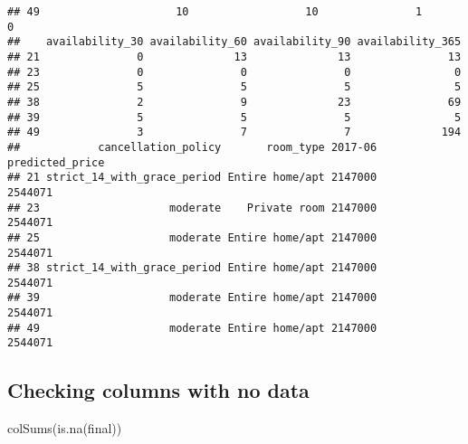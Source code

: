 \documentclass[
]{article}
\newenvironment{Shaded}{\begin{snugshade}}{\end{snugshade}}
\newcommand{\FunctionTok}[1]{\textcolor[rgb]{0.00,0.00,0.00}{#1}}
\newcommand{\NormalTok}[1]{#1}
\begin{document}
\begin{verbatim}
## 49                     10                  10               1            0
##    availability_30 availability_60 availability_90 availability_365
## 21               0              13              13               13
## 23               0               0               0                0
## 25               5               5               5                5
## 38               2               9              23               69
## 39               5               5               5                5
## 49               3               7               7              194
##            cancellation_policy       room_type 2017-06 predicted_price
## 21 strict_14_with_grace_period Entire home/apt 2147000         2544071
## 23                    moderate    Private room 2147000         2544071
## 25                    moderate Entire home/apt 2147000         2544071
## 38 strict_14_with_grace_period Entire home/apt 2147000         2544071
## 39                    moderate Entire home/apt 2147000         2544071
## 49                    moderate Entire home/apt 2147000         2544071
\end{verbatim}

\hypertarget{checking-columns-with-no-data-1}{%
\subsection{Checking columns with no
data}\label{checking-columns-with-no-data-1}}

\begin{Shaded}
\begin{Highlighting}[]
\FunctionTok{colSums}\NormalTok{(}\FunctionTok{is.na}\NormalTok{(final))}
\end{Highlighting}
\end{Shaded}
\end{document}
